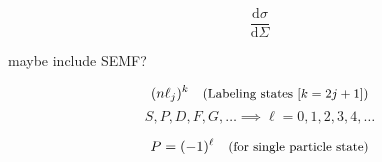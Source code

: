 \begin{equation}
    \frac{\mathrm{d}\sigma}{\mathrm{d} \Sigma}
\end{equation}

maybe include SEMF?

\begin{equation}
    (n \ell_{j})^{k} \quad\text{{\small(Labeling states [$k=2j+1$])}}
\end{equation}
\begin{equation}
    S,P,D,F,G,\dots\implies\ell=0,1,2,3,4,\dots
\end{equation}

\begin{equation}
    P = (-1)^{\ell} \quad\text{{\small(for single particle state)}}
\end{equation}
